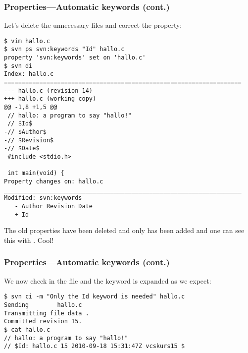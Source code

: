 \begin{frame}[fragile]
    \frametitle{Properties---Automatic keywords (cont.)}
    \linuxframe
    \vspace*{-3mm}
    Let's delete the unnecessary files and correct the
     property:

\begin{lstlisting}[basicstyle=\tiny\ttfamily\color{black}]
$ vim hallo.c
$ svn ps svn:keywords "Id" hallo.c
property 'svn:keywords' set on 'hallo.c'
$ svn di
Index: hallo.c
===================================================================
--- hallo.c (revision 14)
+++ hallo.c (working copy)
@@ -1,8 +1,5 @@
 // hallo: a program to say "hallo!"
 // $Id$
-// $Author$
-// $Revision$
-// $Date$
 #include <stdio.h>

 int main(void) {
Property changes on: hallo.c
___________________________________________________________________
Modified: svn:keywords
   - Author Revision Date
   + Id
\end{lstlisting}
    The old properties have been deleted and only  has been
    added and one can see this with .  Cool!
\end{frame}

\begin{frame}[fragile]
    \frametitle{Properties---Automatic keywords (cont.)}
    \linuxframe

    We now check in the file and the  keyword is expanded as we
    expect:
\begin{lstlisting}
$ svn ci -m "Only the Id keyword is needed" hallo.c
Sending        hallo.c
Transmitting file data .
Committed revision 15.
$ cat hallo.c
// hallo: a program to say "hallo!"
// $Id: hallo.c 15 2010-09-18 15:31:47Z vcskurs15 $
\end{lstlisting}

\end{frame}

